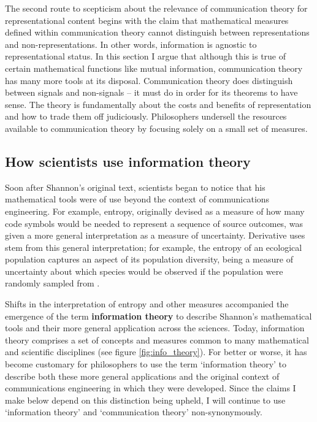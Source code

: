 \documentclass[12pt]{article}
\begin{document}
The second route to scepticism about the relevance of communication theory for representational content begins with the claim that mathematical measures defined within communication theory cannot distinguish between representations and non-representations.
In other words, information is agnostic to representational status.
In this section I argue that although this is true of certain mathematical functions like mutual information, communication theory has many more tools at its disposal.
Communication theory does distinguish between signals and non-signals -- it must do in order for its theorems to have sense.
The theory is fundamentally about the costs and benefits of representation and how to trade them off judiciously.
Philosophers undersell the resources available to communication theory by focusing solely on a small set of measures.

\subsection{How scientists use information theory}\label{subsec:scientists}

Soon after Shannon's original text, scientists began to notice that his mathematical tools were of use beyond the context of communications engineering.
For example, entropy, originally devised as a measure of how many code symbols would be needed to represent a sequence of source outcomes, was given a more general interpretation as a measure of uncertainty.
Derivative uses stem from this general interpretation; for example, the entropy of an ecological population captures an aspect of its population diversity, being a measure of uncertainty about which species would be observed if the population were randomly sampled from \citep{margalef1957information}.

Shifts in the interpretation of entropy and other measures accompanied the emergence of the term \textbf{information theory} to describe Shannon's mathematical tools and their more general application across the sciences.
Today, information theory comprises a set of concepts and measures common to many mathematical and scientific disciplines (see figure \ref{fig:info_theory}).
For better or worse, it has become customary for philosophers to use the term `information theory' to describe both these more general applications and the original context of communications engineering in which they were developed.
Since the claims I make below depend on this distinction being upheld, I will continue to use `information theory' and `communication theory' non-synonymously.
\end{document}
